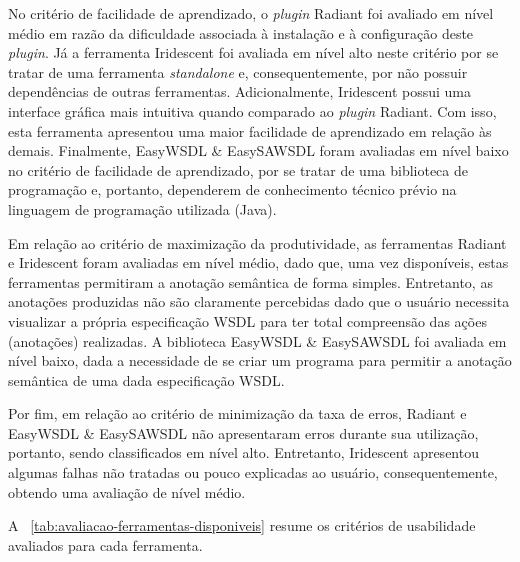 No critério de facilidade de aprendizado, o \textit{plugin} Radiant foi avaliado em nível médio em razão da dificuldade associada à instalação e à configuração deste \textit{plugin}. Já a ferramenta Iridescent foi avaliada em nível alto neste critério por se tratar de uma ferramenta \textit{standalone} e, consequentemente, por não possuir dependências de outras ferramentas. Adicionalmente, Iridescent possui uma interface gráfica mais intuitiva quando comparado ao \textit{plugin} Radiant. Com isso, esta ferramenta apresentou uma maior facilidade de aprendizado em relação às demais. Finalmente, EasyWSDL \& EasySAWSDL foram avaliadas em nível baixo no critério de facilidade de aprendizado,
por se tratar de uma biblioteca de programação e, portanto, dependerem de conhecimento técnico prévio na linguagem de programação utilizada (Java).

Em relação ao critério de maximização da produtividade, as ferramentas Radiant e Iridescent foram avaliadas em nível médio, dado que, uma vez disponíveis, estas ferramentas permitiram a anotação semântica de forma simples. Entretanto, as anotações produzidas não são claramente percebidas dado que o usuário necessita visualizar a própria especificação WSDL para ter total compreensão das ações (anotações) realizadas. A biblioteca EasyWSDL \& EasySAWSDL foi avaliada em nível baixo, dada a necessidade de se criar um programa para permitir a anotação semântica de uma dada especificação WSDL.


Por fim, em relação ao critério de minimização da taxa de erros, Radiant e EasyWSDL \& EasySAWSDL não apresentaram erros durante sua utilização, portanto, sendo classificados em nível alto. Entretanto, Iridescent apresentou algumas falhas não tratadas ou pouco explicadas ao usuário, consequentemente, obtendo uma avaliação de nível médio.

A \tablename~\ref{tab:avaliacao-ferramentas-disponiveis} resume os critérios de usabilidade avaliados para cada ferramenta.

